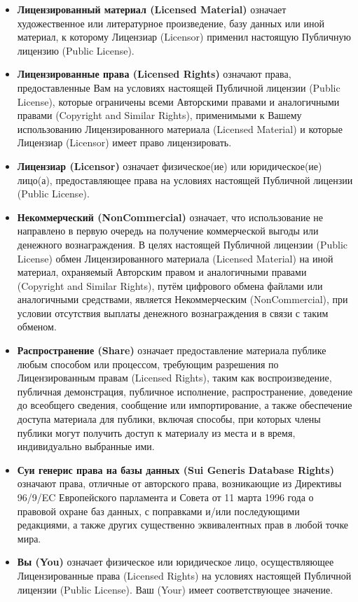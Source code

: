 \begin{itemize}
\item[e.] \textbf{Лицензированный материал (Licensed Material)} означает художественное или литературное произведение, базу данных или иной материал, к которому Лицензиар (Licensor) применил настоящую Публичную лицензию (Public License).

\item[f.] \textbf{Лицензированные права (Licensed Rights)} означают права, предоставленные Вам на условиях настоящей Публичной лицензии (Public License), которые ограничены всеми Авторскими правами и аналогичными правами (Copyright and Similar Rights), применимыми к Вашему использованию Лицензированного материала (Licensed Material) и которые Лицензиар (Licensor) имеет право лицензировать.

\item[g.] \textbf{Лицензиар (Licensor)} означает физическое(ие) или юридическое(ие) лицо(а), предоставляющее права на условиях настоящей Публичной лицензии (Public License).

\item[h.] \textbf{Некоммерческий (NonCommercial)} означает, что использование не направлено в первую очередь на получение коммерческой выгоды или денежного вознаграждения. В целях настоящей Публичной лицензии (Public License) обмен Лицензированного материала (Licensed Material) на иной материал, охраняемый Авторским правом и аналогичными правами (Copyright and Similar Rights), путём цифрового обмена файлами или аналогичными средствами, является Некоммерческим (NonCommercial), при условии отсутствия выплаты денежного вознаграждения в связи с таким обменом.

\item[i.] \textbf{Распространение (Share)} означает предоставление материала публике любым способом или процессом, требующим разрешения по Лицензированным правам (Licensed Rights), таким как воспроизведение, публичная демонстрация, публичное исполнение, распространение, доведение до всеобщего сведения, сообщение или импортирование, а также обеспечение доступа материала для публики, включая способы, при которых члены публики могут получить доступ к материалу из места и в время, индивидуально выбранные ими.

\item[j.] \textbf{Суи генерис права на базы данных (Sui Generis Database Rights)} означают права, отличные от авторского права, возникающие из Директивы 96/9/EC Европейского парламента и Совета от 11 марта 1996 года о правовой охране баз данных, с поправками и/или последующими редакциями, а также других существенно эквивалентных прав в любой точке мира.

\item[k.] \textbf{Вы (You)} означает физическое или юридическое лицо, осуществляющее Лицензированные права (Licensed Rights) на условиях настоящей Публичной лицензии (Public License). Ваш (Your) имеет соответствующее значение.
\end{itemize}

